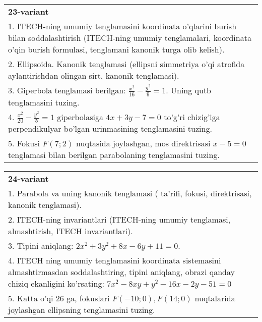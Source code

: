 \documentclass{article}
\begin{document}
\begin{tabular}{m{17cm}}
\textbf{23-variant}\\
1. ITECH-ning umumiy tenglamasini koordinata o'qlarini burish bilan soddalashtirish (ITECH-ning umumiy tenglamalari, koordinata o'qin burish formulasi, tenglamani kanonik turga olib kelish).\\

2. Ellipsoida. Kanonik tenglamasi (ellipsni simmetriya o'qi atrofida aylantirishdan olingan sirt, kanonik tenglamasi).\\

3. Giperbola tenglamasi berilgan: $\frac{x^{2}}{16}-\frac{y^{2}}{9}=1$. Uning qutb tenglamasini tuzing.\\

4. $\frac{x^{2}}{20} - \frac{y^{2}}{5} = 1$ giperbolasiga $4x + 3y - 7 = 0$ to'g'ri chizig'iga perpendikulyar bo'lgan urinmasining tenglamasini tuzing.  \\

5. Fokusi $F(7;2)$ nuqtasida joylashgan, mos direktrisasi $x - 5 = 0$ tenglamasi bilan berilgan parabolaning tenglamasini tuzing.  
\end{tabular}
\vspace{1cm}


\begin{tabular}{m{17cm}}
\textbf{24-variant}\\
1. Parabola va uning kanonik tenglamasi ( ta'rifi, fokusi, direktrisasi, kanonik tenglamasi).\\

2. ITECH-ning invariantlari (ITECH-ning umumiy tenglamasi, almashtirish, ITECH invariantlari).\\

3. Tipini aniqlang: $2x^{2}+3y^{2}+8x-6y+11=0$.\\

4. ITECH ning umumiy tenglamasini koordinata sistemasini almashtirmasdan soddalashtiring, tipini aniqlang, obrazi qanday chiziq ekanligini ko'rsating: $7x^{2} - 8xy + y^{2} - 16x - 2y - 51 = 0$\\

5. Katta o'qi 26 ga, fokuslari $F( - 10;0), F(14;0)$ nuqtalarida joylashgan ellipsning tenglamasini tuzing.  
\end{tabular}
\vspace{1cm}
\end{document}

